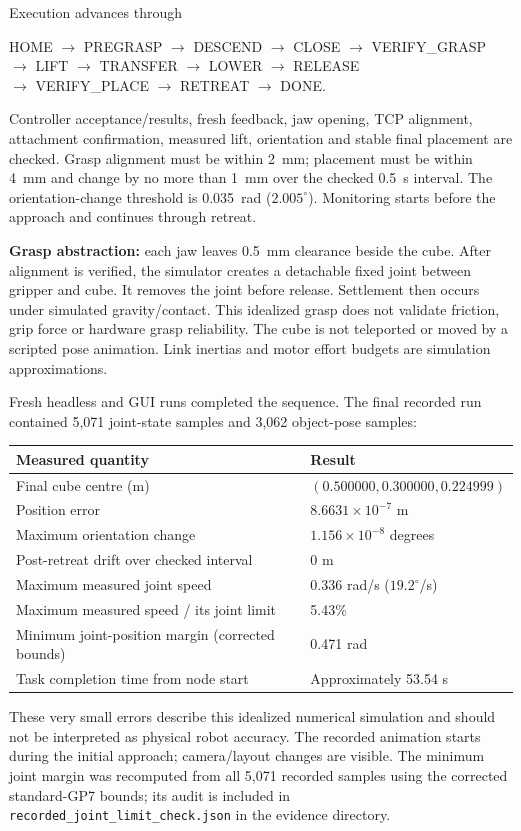 \documentclass[10pt,a4paper]{article}
\begin{document}
Execution advances through
\begin{center}\small
HOME $\to$ PREGRASP $\to$ DESCEND $\to$ CLOSE $\to$ VERIFY\_GRASP\\
$\to$ LIFT $\to$ TRANSFER $\to$ LOWER $\to$ RELEASE\\
$\to$ VERIFY\_PLACE $\to$ RETREAT $\to$ DONE.
\end{center}
Controller acceptance/results, fresh feedback, jaw opening, TCP alignment,
attachment confirmation, measured lift, orientation and stable final placement
are checked. Grasp alignment must be within 2~mm; placement must be within
4~mm and change by no more than 1~mm over the checked 0.5~s interval.
The orientation-change threshold is 0.035~rad ($2.005^\circ$). Monitoring
starts before the approach and continues through retreat.

\textbf{Grasp abstraction:} each jaw leaves 0.5~mm clearance beside the cube.
After alignment is verified, the simulator creates a detachable fixed joint
between gripper and cube. It removes the joint before release. Settlement
then occurs under simulated gravity/contact. This idealized grasp does not
validate friction, grip force or hardware grasp reliability. The cube is not
teleported or moved by a scripted pose animation. Link inertias and motor
effort budgets are simulation approximations.

Fresh headless and GUI runs completed the sequence. The final recorded run
contained 5,071 joint-state samples and 3,062 object-pose samples:
\begin{center}
\begin{tabular}{ll}
\toprule
Measured quantity & Result\\
\midrule
Final cube centre (m) & $(0.500000,0.300000,0.224999)$\\
Position error & $8.6631\times10^{-7}$ m\\
Maximum orientation change & $1.156\times10^{-8}$ degrees\\
Post-retreat drift over checked interval & 0 m\\
Maximum measured joint speed & 0.336 rad/s ($19.2^\circ$/s)\\
Maximum measured speed / its joint limit & 5.43\%\\
Minimum joint-position margin (corrected bounds) & 0.471 rad\\
Task completion time from node start & Approximately 53.54 s\\
\bottomrule
\end{tabular}
\end{center}
These very small errors describe this idealized numerical simulation and
should not be interpreted as physical robot accuracy. The recorded animation
starts during the initial approach; camera/layout changes are visible.
The minimum joint margin was recomputed from all 5,071 recorded samples using
the corrected standard-GP7 bounds; its audit is included in
\texttt{recorded\_joint\_limit\_check.json} in the evidence directory.
\end{document}
